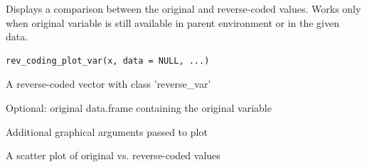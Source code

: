 \documentclass[a4paper]{book}
\begin{document}
%
\begin{Description}
Displays a comparison between the original and reverse-coded values.
Works only when original variable is still available in parent environment or in the given data.
\end{Description}
%
\begin{Usage}
\begin{verbatim}
rev_coding_plot_var(x, data = NULL, ...)
\end{verbatim}
\end{Usage}
%
\begin{Arguments}
\begin{ldescription}
\item[\code{x}] A reverse-coded vector with class 'reverse\_var'

\item[\code{data}] Optional: original data.frame containing the original variable

\item[\code{...}] Additional graphical arguments passed to plot
\end{ldescription}
\end{Arguments}
%
\begin{Value}
A scatter plot of original vs. reverse-coded values
\end{Value}
%
\begin{Examples}
\end{Examples}
\end{document}
